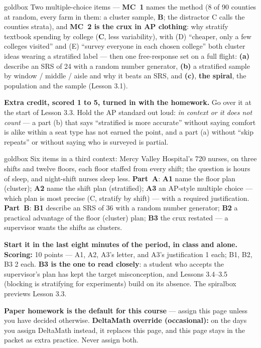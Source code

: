 \documentclass[10pt]{article}
\begin{document}
\boxguard
\begin{skillbox}{goldbox}
Two multiple-choice items --- \textbf{MC~1} names the method (8 of 90 counties at random, every
farm in them: a cluster sample, \textbf{B}; the distractor C calls the counties strata), and
\textbf{MC~2 is the crux in AP clothing}: why stratify textbook spending by college
(\textbf{C}, less variability), with (D) ``cheaper, only a few colleges visited'' and (E)
``survey everyone in each chosen college'' both cluster ideas wearing a stratified label ---
then one free-response set on a full flight: \textbf{(a)} describe an SRS of 24 with a random
number generator, \textbf{(b)} a stratified sample by window / middle / aisle and why it beats
an SRS, and \textbf{(c)}, \textbf{the spiral}, the population and the sample (Lesson 3.1).

\textbf{Extra credit, scored 1 to 5, turned in with the homework.} Go over it at the start of
Lesson 3.3. Hold the AP standard out loud: \emph{in context or it does not count} --- a part (b)
that says ``stratified is more accurate'' without saying comfort is alike within a seat type
has not earned the point, and a part (a) without ``skip repeats'' or without saying who is
surveyed is partial.
\end{skillbox}

\boxguard
\begin{skillbox}{goldbox}
Six items in a third context: Mercy Valley Hospital's 720 nurses, on three shifts and twelve
floors, each floor staffed from every shift; the question is hours of sleep, and night-shift
nurses sleep less. \textbf{Part~A}: \textbf{A1} name the floor plan (cluster); \textbf{A2} name
the shift plan (stratified); \textbf{A3} an AP-style multiple choice --- which plan is most
precise (C, stratify by shift) --- with a required justification. \textbf{Part~B}: \textbf{B1}
describe an SRS of 36 with a random number generator; \textbf{B2} a practical advantage of the
floor (cluster) plan; \textbf{B3} the crux restated --- a supervisor wants the shifts as
clusters.

\textbf{Start it in the last eight minutes of the period, in class and alone.}
\textbf{Scoring:} 10 points --- A1, A2, A3's letter, and A3's justification 1 each; B1, B2, B3
2 each. \textbf{B3 is the one to read closely}: a student who accepts the supervisor's plan has
kept the target misconception, and Lessons 3.4--3.5 (blocking is stratifying for experiments)
build on its absence. The spiralbox previews Lesson 3.3.

\textbf{Paper homework is the default for this course} --- assign this page unless you have
decided otherwise. \textbf{DeltaMath override (occasional):} on the days you assign DeltaMath
instead, it replaces this page, and this page stays in the packet as extra practice. Never
assign both.
\end{skillbox}
\end{document}
